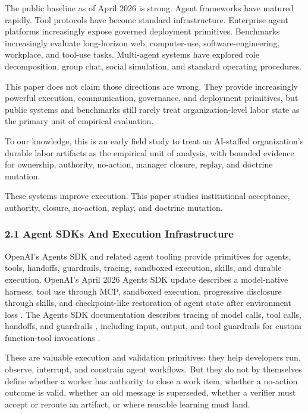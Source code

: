\documentclass[
]{article}
\begin{document}
The public baseline as of April 2026 is strong. Agent frameworks have matured rapidly. Tool protocols have become standard infrastructure. Enterprise agent platforms increasingly expose governed deployment primitives. Benchmarks increasingly evaluate long-horizon web, computer-use, software-engineering, workplace, and tool-use tasks. Multi-agent systems have explored role decomposition, group chat, social simulation, and standard operating procedures.

This paper does not claim those directions are wrong. They provide increasingly powerful execution, communication, governance, and deployment primitives, but public systems and benchmarks still rarely treat organization-level labor state as the primary unit of empirical evaluation.

To our knowledge, this is an early field study to treat an AI-staffed organization's durable labor artifacts as the empirical unit of analysis, with bounded evidence for ownership, authority, no-action, manager closure, replay, and doctrine mutation.

These systems improve execution. This paper studies institutional acceptance, authority, closure, no-action, replay, and doctrine mutation.

\subsubsection{2.1 Agent SDKs And Execution Infrastructure}\label{agent-sdks-and-execution-infrastructure}

OpenAI's Agents SDK and related agent tooling provide primitives for agents, tools, handoffs, guardrails, tracing, sandboxed execution, skills, and durable execution. OpenAI's April 2026 Agents SDK update describes a model-native harness, tool use through MCP, sandboxed execution, progressive disclosure through skills, and checkpoint-like restoration of agent state after environment loss \citep{openai2026agentsSdkEvolution}. The Agents SDK documentation describes tracing of model calls, tool calls, handoffs, and guardrails \citep{openai2026agentsSdkTracing}, including input, output, and tool guardrails for custom function-tool invocations \citep{openai2026agentsSdkGuardrails}.

These are valuable execution and validation primitives: they help developers run, observe, interrupt, and constrain agent workflows. But they do not by themselves define whether a worker has authority to close a work item, whether a no-action outcome is valid, whether an old message is superseded, whether a verifier must accept or reroute an artifact, or where reusable learning must land.
\end{document}
